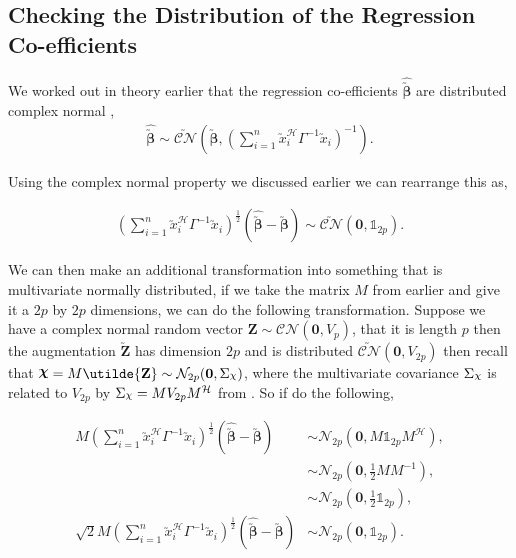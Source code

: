 \documentclass[honours,12pt]{unswthesis}
\newcommand{\ct}{\mathcal{H}}
\DeclareRobustCommand{\Chi}{{\mathpalette\irchi\relax}}
\newcommand{\irchi}[2]{\raisebox{\depth}{$#1\chi$}} %
\numberwithin{equation}{section}
\begin{document}

\subsection{Checking the Distribution of the Regression Co-efficients}

We worked out in theory earlier that the regression co-efficients $\widehat{\utilde{\bm{\beta}}}$ are distributed complex normal ,
\begin{align*}
	\widehat{\utilde{\bm{\beta}}} \sim \utilde{\mathcal{CN}} \left( \utilde{\bm{\beta}}, \left( \sum_{i = 1}^{n} \utilde{x}_{i}^{\ct} \Gamma^{-1} \utilde{x}_{i} \right)^{-1} \right).
\end{align*}

\noindent Using the complex normal property  we discussed earlier we can rearrange this as,

\begin{align*}
	\left( \sum_{i = 1}^{n} \utilde{x}_{i}^{\ct} \Gamma^{-1} \utilde{x}_{i} \right)^{\frac{1}{2}} \left( \widehat{\utilde{\bm{\beta}}} - \utilde{\bm{\beta}} \right) \sim \utilde{\mathcal{CN}} \left( \mathbf{0}, \mathbb{1}_{2p} \right).
\end{align*}

\noindent We can then make an additional transformation into something that is multivariate normally distributed, if we take the matrix $M$ from earlier and give it a $2 p$ by $2 p$ dimensions, we can do the following transformation. Suppose we have a complex normal random vector $\mathbf{Z} \sim \mathcal{CN}(\mathbf{0}, V_{p})$, that it is length $p$ then the augmentation $\utilde{\mathbf{Z}}$ has dimension $2 p$ and is distributed $\utilde{\mathcal{CN}} ( \mathbf{0}, V_{2p} )$ then recall that $\bm{\Chi} = M \utilde{\mathbf{Z}} \sim \mathcal{N}_{2 p} ( \mathbf{0}, \Sigma_{\Chi})$, where the multivariate covariance $\Sigma_{\Chi}$ is related to $V_{2p}$ by $\Sigma_{\Chi} = M V_{2 p} M^{\ct}$ from . So if do the following,

\begin{align*}
	M \left( \sum_{i = 1}^{n} \utilde{x}_{i}^{\ct} \Gamma^{-1} \utilde{x}_{i} \right)^{\frac{1}{2}} \left( \widehat{\utilde{\bm{\beta}}} - \utilde{\bm{\beta}} \right) &\sim\mathcal{N}_{2 p} \left( \mathbf{0}, M \mathbb{1}_{2p} M^{\ct} \right),\\
	&\sim \mathcal{N}_{2 p} ( \mathbf{0}, \frac{1}{2} M M^{-1} ),\\
	&\sim \mathcal{N}_{2 p} ( \mathbf{0}, \frac{1}{2}\mathbb{1}_{2 p} ),\\
	\sqrt{2} M \left( \sum_{i = 1}^{n} \utilde{x}_{i}^{\ct} \Gamma^{-1} \utilde{x}_{i} \right)^{\frac{1}{2}} \left( \widehat{\utilde{\bm{\beta}}} - \utilde{\bm{\beta}} \right) &\sim \mathcal{N}_{2 p} ( \mathbf{0}, \mathbb{1}_{2 p} ).
\end{align*}
\end{document}

